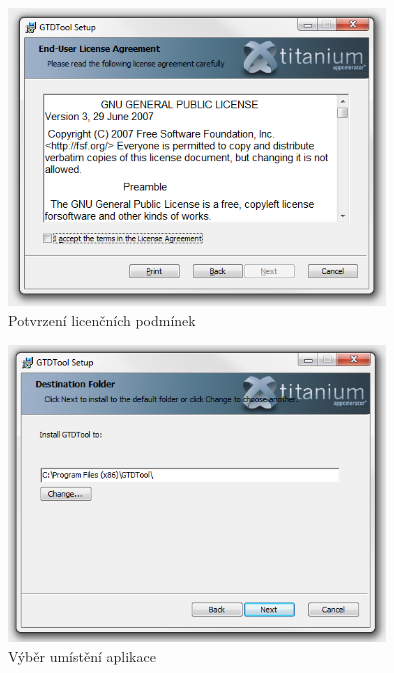 \documentclass[11pt,oneside,a4paper]{book}
\begin{document}
\begin{figure}[h]
	\begin{center}
		\includegraphics[width=10cm]{figures/install/02.png}
		\caption{Potvrzení licenčních podmínek}
		\label{fig:install-02}
	\end{center}
\end{figure}

\begin{figure}[h]
	\begin{center}
		\includegraphics[width=10cm]{figures/install/03.png}
		\caption{Výběr umístění aplikace}
		\label{fig:install-03}
	\end{center}
\end{figure}
\end{document}
